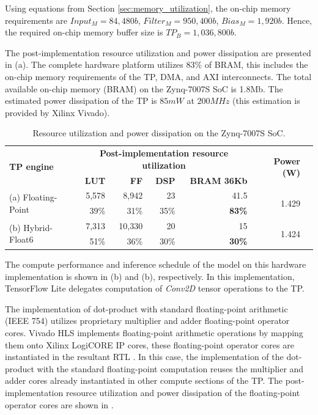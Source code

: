 Using equations from Section \ref{sec:memory_utilization}, the on-chip memory requirements are $Input_M=84,480b$, $Filter_M=950,400b$, $Bias_M=1,920b$. Hence, the required on-chip memory buffer size is $TP_B=1,036,800b$.

The post-implementation resource utilization and power dissipation are presented in (a). The complete hardware platform utilizes 83\% of BRAM, this includes the on-chip memory requirements of the TP, DMA, and AXI interconnects. The total available on-chip memory (BRAM) on the Zynq-7007S SoC is 1.8Mb. The estimated power dissipation of the TP is $85mW$ at $200MHz$ (this estimation is provided by Xilinx Vivado).

\begin{table}[!htp]\centering
	\caption{Resource utilization and power dissipation on the Zynq-7007S SoC.}\label{tab:resource_utilization}
	\scriptsize
	\begin{tabular}{lrrrrrr}\toprule
		\multirow{2}{*}{\textbf{TP engine}} &\multicolumn{4}{c}{\textbf{Post-implementation resource utilization}} &\multirow{2}{*}{\textbf{Power (W)}} \\\cmidrule{2-5}
		&\textbf{LUT} &\textbf{FF} &\textbf{DSP} &\textbf{BRAM 36Kb} & \\\midrule
		\multirow{2}{*}{(a) Floating-Point} &5,578 &8,942 &23 &41.5 &\multirow{2}{*}{1.429} \\
		&39\% &31\% &35\% &\textbf{83\%} & \\
		\multirow{2}{*}{(b) Hybrid-Float6} &7,313 &10,330 &20 &15 &\multirow{2}{*}{1.424} \\
		&51\% &36\% &30\% &\textbf{30\%} & \\
		\bottomrule
	\end{tabular}
\end{table}

The compute performance and inference schedule of the model on this hardware implementation is shown in (b) and (b), respectively. In this implementation, TensorFlow Lite delegates computation of \emph{Conv2D} tensor operations to the TP.

The implementation of dot-product with standard floating-point arithmetic (IEEE 754) utilizes proprietary multiplier and adder floating-point operator cores. Vivado HLS implements floating-point arithmetic operations by mapping them onto Xilinx LogiCORE IP cores, these floating-point operator cores are instantiated in the resultant RTL \cite{hrica2012floating}. In this case, the implementation of the dot-product with the standard floating-point computation reuses the multiplier and adder cores already instantiated in other compute sections of the TP. The post-implementation resource utilization and power dissipation of the floating-point operator cores are shown in .

